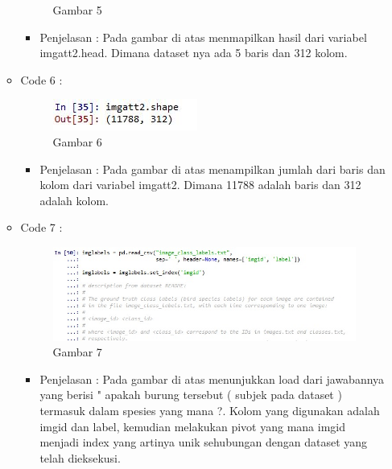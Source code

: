 \begin{enumerate}
\begin{itemize}
\begin{figure}[ht]
\caption{Gambar 5}
\label{contoh}
\end{figure}
\par
\begin{itemize}
\item Penjelasan : Pada gambar di atas menmapilkan hasil dari variabel imgatt2.head. Dimana dataset nya ada 5 baris dan 312 kolom.
\par
\par
\end{itemize}
\item Code 6 :
\par
\begin{figure}[ht]
\centering
\includegraphics[scale=0.7]{figures/pd6.jpg}
\caption{Gambar 6}
\label{contoh}
\end{figure}
\par
\begin{itemize}
\item Penjelasan : Pada gambar di atas menampilkan jumlah dari baris dan kolom dari variabel imgatt2. Dimana 11788 adalah baris dan 312 adalah kolom.
\par
\par
\end{itemize}
\item Code 7 :
\par
\begin{figure}[ht]
\centering
\includegraphics[scale=0.7]{figures/pd7.jpeg}
\caption{Gambar 7}
\label{contoh}
\end{figure}
\par
\begin{itemize}
\item Penjelasan : Pada gambar di atas menunjukkan load dari  jawabannya yang berisi " apakah burung tersebut ( subjek pada dataset ) termasuk dalam spesies yang mana ?. Kolom yang digunakan adalah imgid dan label, kemudian melakukan pivot yang mana imgid menjadi index yang artinya unik sehubungan dengan dataset yang telah dieksekusi.

\end{itemize}
\end{itemize}
\end{enumerate}

